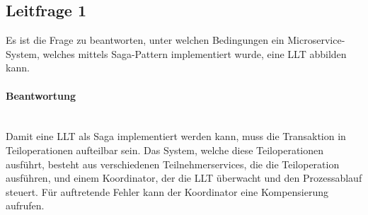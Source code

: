 \subsection{Leitfrage 1}
Es ist die Frage zu beantworten, unter welchen Bedingungen ein Microservice-System, welches mittels Saga-Pattern implementiert wurde, eine LLT abbilden kann. 

\paragraph*{Beantwortung} \mbox{} \\
Damit eine LLT als Saga implementiert werden kann, muss die Transaktion in Teiloperationen aufteilbar sein. Das System, welche diese Teiloperationen ausführt, besteht aus verschiedenen Teilnehmerservices, die die Teiloperation ausführen, und einem Koordinator, der die LLT überwacht und den Prozessablauf steuert. Für auftretende Fehler kann der Koordinator eine Kompensierung aufrufen. 
